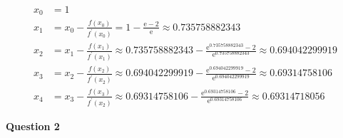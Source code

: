 \documentclass{article}
\begin{document}
\begin{enumerate}[label=\textbf{WS \arabic*}]
\begin{align}
x_0 &= 1 \\
x_1 &= x_0-\frac{f(x_0)}{f^\prime(x_0)}=1-\frac{\text{e}-2}{\text{e}}\approx0.735758882343 \\
x_2 &= x_1-\frac{f(x_1)}{f^\prime(x_1)}\approx0.735758882343-\frac{\text{e}^0.735758882343-2}{\text{e}^0.735758882343}\approx0.694042299919 \\
x_3 &= x_2-\frac{f(x_2)}{f^\prime(x_2)}\approx0.694042299919-\frac{\text{e}^0.694042299919-2}{\text{e}^0.694042299919}\approx0.69314758106 \\
x_4 &= x_3-\frac{f(x_3)}{f^\prime(x_2)}\approx0.69314758106-\frac{\text{e}^0.69314758106-2}{\text{e}^0.69314758106}\approx0.69314718056
\end{align}

\end{enumerate}

\newpage

\begin{center}
\textbf{Question 2}
\end{center}
\end{document}
